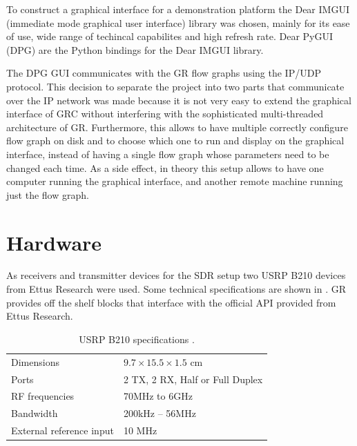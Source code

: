 To construct a graphical interface for a demonstration platform the Dear IMGUI (immediate mode graphical user interface) library was chosen, mainly for its ease of use, wide range of techincal capabilites and high refresh rate. Dear PyGUI (DPG) are the Python bindings for the Dear IMGUI library.

The DPG GUI communicates with the GR flow graphs using the IP/UDP protocol. This decision to separate the project into two parts that communicate over the IP network was made because it is not very easy to extend the graphical interface of GRC without interfering with the sophisticated multi-threaded architecture of GR. Furthermore, this allows to have multiple correctly configure flow graph on disk and to choose which one to run and display on the graphical interface, instead of having a single flow graph whose parameters need to be changed each time. As a side effect, in theory this setup allows to have one computer running the graphical interface, and another remote machine running just the flow graph.

\section{Hardware}

As receivers and transmitter devices for the SDR setup two USRP B210 devices from Ettus Research were used. Some technical specifications are shown in . GR provides off the shelf blocks that interface with the official API provided from Ettus Research.

\begin{table}[h]
	\centering
	\begin{tabular}{ll}
		\toprule
		Dimensions               & \(9.7 \times 15.5 \times 1.5\) cm \\
		Ports                    & 2 TX, 2 RX, Half or Full Duplex   \\
		RF frequencies           & 70MHz to 6GHz                     \\
		Bandwidth                & 200kHz -- 56MHz                   \\
		External reference input & 10 MHz                            \\
		\bottomrule
	\end{tabular}
	\caption{USRP B210 specifications \cite{EttusUSRPB210}. \label{tab:usrp-specs}}
\end{table}

